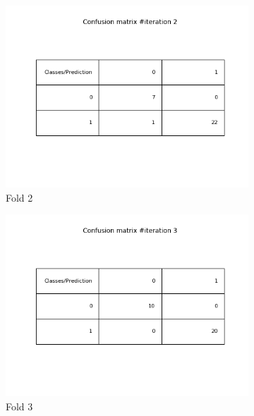 \documentclass[11pt]{scrartcl}
\begin{document}
\begin{enumerate}
\begin{figure}[h!]
\begin{subfigure}[b]{0.4\linewidth}
					\includegraphics[width=\linewidth]{confusionMatrix2.png}
					\caption{Fold 2}
				\end{subfigure}
				\begin{subfigure}[b]{0.4\linewidth}
					\includegraphics[width=\linewidth]{confusionMatrix3.png}
					\caption{Fold 3}
				\end{subfigure}
				\begin{subfigure}[b]{0.4\linewidth}

\end{subfigure}
\end{figure}
\end{enumerate}
\end{document}
